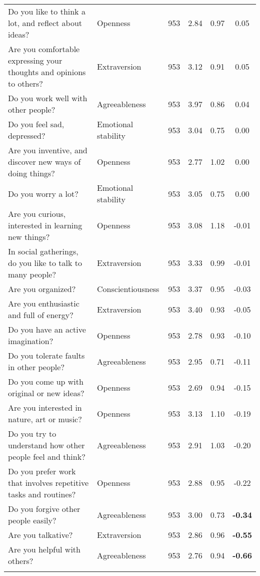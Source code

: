 \begin{table}[htbp]
{\begin{tabular}{llcccc}
    Do you like to think a lot, and reflect about ideas? & Openness & 953   & 2.84  & 0.97  & 0.05 \\
    Are you comfortable expressing your thoughts and opinions to others? & Extraversion & 953   & 3.12  & 0.91  & 0.05 \\
    Do you work well with other people? & Agreeableness & 953   & 3.97  & 0.86  & 0.04 \\
    Do you feel sad, depressed? & Emotional stability & 953   & 3.04  & 0.75  & 0.00 \\
    Are you inventive, and discover new ways of doing things? & Openness & 953   & 2.77  & 1.02  & 0.00 \\
    Do you worry a lot? & Emotional stability & 953   & 3.05  & 0.75  & 0.00 \\
    Are you curious, interested in learning new things? & Openness & 953   & 3.08  & 1.18  & -0.01 \\
    In social gatherings, do you like to talk to many people? & Extraversion & 953   & 3.33  & 0.99  & -0.01 \\
    Are you organized? & Conscientiousness & 953   & 3.37  & 0.95  & -0.03 \\
    Are you enthusiastic and full of energy? & Extraversion & 953   & 3.40  & 0.93  & -0.05 \\
    Do you have an active imagination? & Openness & 953   & 2.78  & 0.93  & -0.10 \\
    Do you tolerate faults in other people? & Agreeableness & 953   & 2.95  & 0.71  & -0.11 \\
    Do you come up with original or new ideas? & Openness & 953   & 2.69  & 0.94  & -0.15 \\
    Are you interested in nature, art or music? & Openness & 953   & 3.13  & 1.10  & -0.19 \\
    Do you try to understand how other people feel and think? & Agreeableness & 953   & 2.91  & 1.03  & -0.20 \\
    Do you prefer work that involves repetitive tasks and routines? & Openness & 953   & 2.88  & 0.95  & -0.22 \\
    Do you forgive other people easily? & Agreeableness & 953   & 3.00  & 0.73  & \textbf{-0.34} \\
    Are you talkative? & Extraversion & 953   & 2.86  & 0.96  & \textbf{-0.55} \\
    Are you helpful with others? & Agreeableness & 953   & 2.76  & 0.94  & \textbf{-0.66} \\
    \bottomrule
	\Tablenote{6}{Most contributive variables (represented with \textbf{bold font}) are used to interpret factor.} \\
    \end{tabular}%
	}
  \label{tab:factor3}%
\end{table}%
